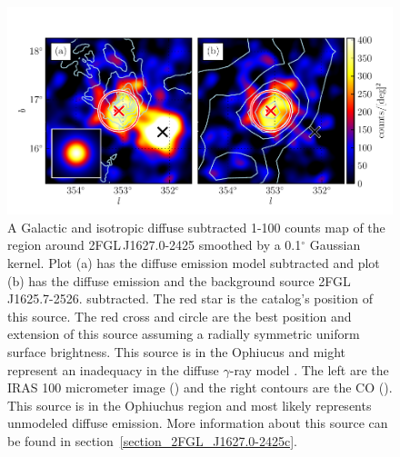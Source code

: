 \documentclass[12pt,preprint]{aastex}
\newcommand{\gev}{\text{GeV}\xspace}
\renewcommand{\deg}{\ensuremath{^\circ}\xspace}
\begin{document}
\begin{figure}
  \begin{center}
    \includegraphics[type=pdf,ext=.pdf,read=.pdf]{source_plots/source_1FGL_J1628.6-2419c}
  \end{center}
  \caption{
  A Galactic and isotropic diffuse subtracted 1-100 \gev counts
  map of the region around 2FGL\,J1627.0-2425 smoothed by a 0.1\deg
  Gaussian kernel.  Plot (a) has the diffuse emission model subtracted
  and plot (b) has the diffuse emission and the background source
  2FGL\,J1625.7-2526.  subtracted.  The red star is the catalog's
  position of this source.  The red cross and circle are the best
  position and extension of this source assuming a radially symmetric
  uniform surface brightness.  This source is in the Ophiucus and might
  represent an inadequacy in the diffuse $\gamma$-ray model . The left are
  the IRAS 100 micrometer image (\cite{iras_rho_ophiuci}) and the right
  contours are the CO (\cite{co_rho_ophiuci}).  This source is in the
  Ophiuchus region and most likely represents unmodeled diffuse emission.
  More information about this source can be found in
  section~\ref{section_2FGL_J1627.0-2425c}.
  }\label{1FGL_J1628.6-2419c}
\end{figure}
\end{document}
